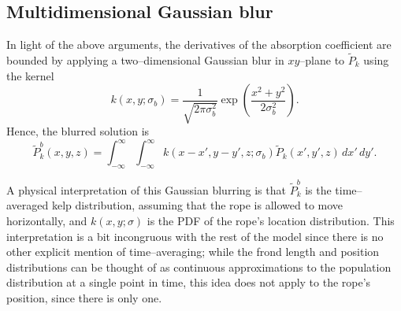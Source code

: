 \subsection{Multidimensional Gaussian blur}
In light of the above arguments, the derivatives of the absorption coefficient are bounded by applying a two--dimensional Gaussian blur in $xy$--plane to $\tilde{P}_k$ using the kernel
\begin{equation}
  k(x, y; \sigma_b) = \frac{1}{\sqrt{2\pi\sigma_b^2}} \exp\left(\frac{x^2 + y^2}{2\sigma_b^2}\right).
\end{equation}
Hence, the blurred solution is
\begin{equation}
  \tilde{P}_k^b(x, y, z) = \int_{-\infty}^\infty \int_{-\infty}^\infty k(x-x', y-y', z; \sigma_b) \tilde{P}_k(x', y', z)\, dx'\, dy'.
\end{equation}

A physical interpretation of this Gaussian blurring is that $\tilde{P}_k^b$ is the time--averaged kelp distribution, assuming that the rope is allowed to move horizontally, and $k(x, y; \sigma)$ is the PDF of the rope's location distribution.
This interpretation is a bit incongruous with the rest of the model since there is no other explicit mention of time--averaging; while the frond length and position distributions can be thought of as continuous approximations to the population distribution at a single point in time, this idea does not apply to the rope's position, since there is only one.

